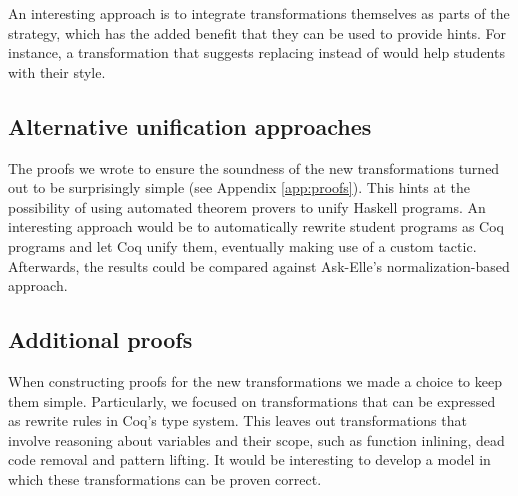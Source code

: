 An interesting approach is to integrate transformations themselves as parts of the strategy, which has the added benefit that they can be used to provide hints. For instance, a transformation that suggests replacing  instead of  would help students with their style.

\subsection{Alternative unification approaches}

The proofs we wrote to ensure the soundness of the new transformations turned out to be surprisingly simple (see Appendix \ref{app:proofs}). This hints at the possibility of using automated theorem provers to unify Haskell programs. An interesting approach would be to automatically rewrite student programs as Coq programs and let Coq unify them, eventually making use of a custom tactic. Afterwards, the results could be compared against Ask-Elle's normalization-based approach.

\subsection{Additional proofs}

When constructing proofs for the new transformations we made a choice to keep them simple. Particularly, we focused on transformations that can be expressed as rewrite rules in Coq's type system. This leaves out transformations that involve reasoning about variables and their scope, such as function inlining, dead code removal and pattern lifting. It would be interesting to develop a model in which these transformations can be proven correct.
